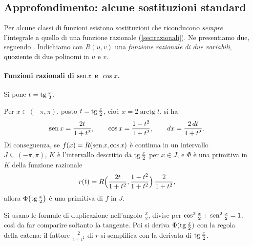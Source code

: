 \subsection{Approfondimento: alcune sostituzioni standard}
\label{subsec:sostituzioni-standard}

Per alcune classi di funzioni esistono sostituzioni che riconducono \emph{sempre}
l'integrale a quello di una funzione razionale (\cref{sec:razionali}). Ne presentiamo
due, seguendo \cite{giusti}. Indichiamo con $R(u,v)$ una \emph{funzione razionale di due
variabili}, quoziente di due polinomi in $u$ e $v$.

\paragraph{Funzioni razionali di $\operatorname{sen} x$ e $\cos x$.} Si pone $t=\tg\frac x2$.

\begin{proposizione}[La sostituzione $t=\tg\frac x2$]\label{prop:sostituzione-tg-mezzi}
Per $x\in(-\pi,\pi)$, posto $t=\tg\frac x2$, cioè $x=2\operatorname{arctg}t$, si ha
\begin{equation}\label{eq:formule-parametriche}
  \operatorname{sen} x=\frac{2t}{1+t^{2}}, \qquad \cos x=\frac{1-t^{2}}{1+t^{2}}, \qquad
  dx=\frac{2\,dt}{1+t^{2}} .
\end{equation}
Di conseguenza, se $f(x)=R(\operatorname{sen} x,\cos x)$ è continua in un intervallo $J\subseteq(-\pi,\pi)$,
$K$ è l'intervallo descritto da $\operatorname{tg}\frac x2$ per $x\in J$, e $\Phi$ è una primitiva in $K$
della funzione razionale
\begin{equation}\label{eq:integranda-razionale-t}
  r(t)=R\Bigl(\frac{2t}{1+t^{2}},\frac{1-t^{2}}{1+t^{2}}\Bigr)\,\frac2{1+t^{2}} ,
\end{equation}
allora $\Phi\bigl(\operatorname{tg}\frac x2\bigr)$ è una primitiva di $f$ in $J$.
\end{proposizione}

\begin{schema}
\end{schema}

\begin{strategia}
Si usano le formule di duplicazione nell'angolo $\frac x2$, divise per
$\cos^{2}\frac x2+\operatorname{sen}^{2}\frac x2=1$, così da far comparire soltanto la tangente. Poi si
deriva $\Phi(\operatorname{tg}\frac x2)$ con la regola della catena: il fattore $\frac2{1+t^{2}}$ di $r$ si
semplifica con la derivata di $\operatorname{tg}\frac x2$.
\end{strategia}

